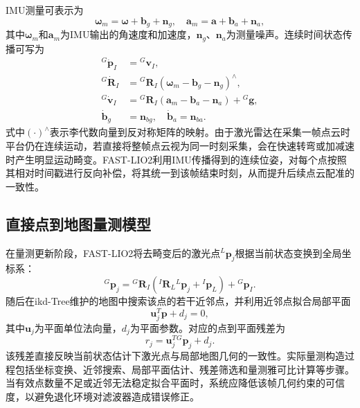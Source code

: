 IMU测量可表示为
\begin{equation}
    \boldsymbol{\omega}_{m}=\boldsymbol{\omega}+\mathbf{b}_{g}+\mathbf{n}_{g},
    \quad
    \mathbf{a}_{m}=\mathbf{a}+\mathbf{b}_{a}+\mathbf{n}_{a},
    \label{eq:imu_measurement}
\end{equation}
其中$\boldsymbol{\omega}_{m}$和$\mathbf{a}_{m}$为IMU输出的角速度和加速度，$\mathbf{n}_{g}$、$\mathbf{n}_{a}$为测量噪声。连续时间状态传播可写为
\begin{equation}
\begin{aligned}
    {}^{G}\dot{\mathbf{p}}_{I} &= {}^{G}\mathbf{v}_{I},\\
    {}^{G}\dot{\mathbf{R}}_{I} &= {}^{G}\mathbf{R}_{I}
    \left(\boldsymbol{\omega}_{m}-\mathbf{b}_{g}-\mathbf{n}_{g}\right)^{\wedge},\\
    {}^{G}\dot{\mathbf{v}}_{I} &= {}^{G}\mathbf{R}_{I}
    \left(\mathbf{a}_{m}-\mathbf{b}_{a}-\mathbf{n}_{a}\right)
    +{}^{G}\mathbf{g},\\
    \dot{\mathbf{b}}_{g} &= \mathbf{n}_{bg},\quad
    \dot{\mathbf{b}}_{a} = \mathbf{n}_{ba}.
\end{aligned}
    \label{eq:imu_propagation}
\end{equation}
式中$(\cdot)^{\wedge}$表示李代数向量到反对称矩阵的映射。由于激光雷达在采集一帧点云时平台仍在连续运动，若直接将整帧点云视为同一时刻采集，会在快速转弯或加减速时产生明显运动畸变。FAST-LIO2利用IMU传播得到的连续位姿，对每个点按照其相对时间戳进行反向补偿，将其统一到该帧结束时刻，从而提升后续点云配准的一致性。

\subsection{直接点到地图量测模型}
在量测更新阶段，FAST-LIO2将去畸变后的激光点${}^{L}\mathbf{p}_{j}$根据当前状态变换到全局坐标系：
\begin{equation}
    {}^{G}\mathbf{p}_{j}
    =
    {}^{G}\mathbf{R}_{I}
    \left(
    {}^{I}\mathbf{R}_{L}{}^{L}\mathbf{p}_{j}
    +{}^{I}\mathbf{p}_{L}
    \right)
    +{}^{G}\mathbf{p}_{I}.
    \label{eq:point_transform}
\end{equation}
随后在ikd-Tree维护的地图中搜索该点的若干近邻点，并利用近邻点拟合局部平面
\begin{equation}
    \mathbf{u}_{j}^{T}\mathbf{p}+d_{j}=0,
    \label{eq:local_plane}
\end{equation}
其中$\mathbf{u}_{j}$为平面单位法向量，$d_{j}$为平面参数。对应的点到平面残差为
\begin{equation}
    r_{j}
    =
    \mathbf{u}_{j}^{T}{}^{G}\mathbf{p}_{j}
    +d_{j}.
    \label{eq:point_plane_residual}
\end{equation}
该残差直接反映当前状态估计下激光点与局部地图几何的一致性。实际量测构造过程包括坐标变换、近邻搜索、局部平面估计、残差筛选和量测雅可比计算等步骤。当有效点数量不足或近邻无法稳定拟合平面时，系统应降低该帧几何约束的可信度，以避免退化环境对滤波器造成错误修正。


